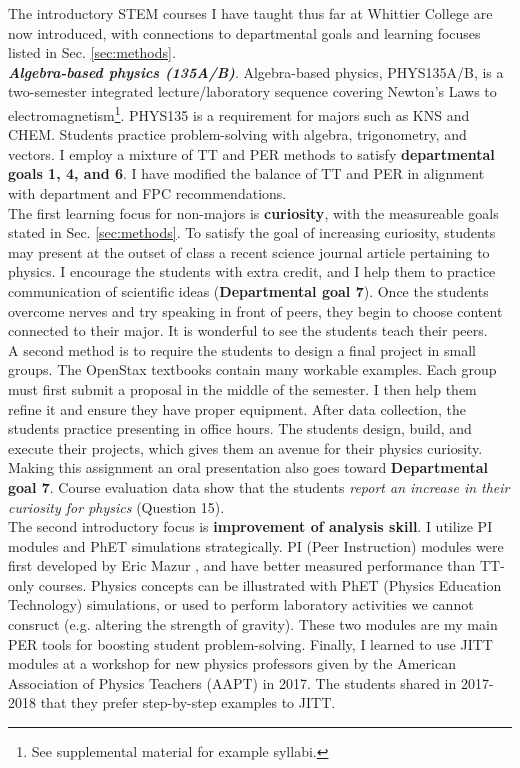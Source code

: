 \documentclass[../../../main.tex]{subfiles}
\begin{document}
The introductory STEM courses I have taught thus far at Whittier College are now introduced, with connections to departmental goals and learning focuses listed in Sec. \ref{sec:methods}.
\\
\vspace{0.25cm}
\textbf{\textit{Algebra-based physics (135A/B)}}. Algebra-based physics, PHYS135A/B, is a two-semester integrated lecture/laboratory sequence covering Newton's Laws to electromagnetism\footnote{See supplemental material for example syllabi.}.  PHYS135 is a requirement for majors such as KNS and CHEM.  Students practice problem-solving with algebra, trigonometry, and vectors.  I employ a mixture of TT and PER methods to satisfy \textbf{departmental goals 1, 4, and 6}.  I have modified the balance of TT and PER in alignment with department and FPC recommendations.
\\
\vspace{0.25cm}
The first learning focus for non-majors is \textbf{curiosity}, with the measureable goals stated in Sec. \ref{sec:methods}.  To satisfy the goal of increasing curiosity, students may present at the outset of class a recent science journal article pertaining to physics.  I encourage the students with extra credit, and I help them to practice communication of scientific ideas (\textbf{Departmental goal 7}).  Once the students overcome nerves and try speaking in front of peers, they begin to choose content connected to their major.  It is wonderful to see the students teach their peers.
\\
\vspace{0.25cm}
A second method is to require the students to design a final project in small groups.  The OpenStax textbooks contain many workable examples.  Each group must first submit a proposal in the middle of the semester.  I then help them refine it and ensure they have proper equipment.  After data collection, the students practice presenting in office hours.  The students design, build, and execute their projects, which gives them an avenue for their physics curiosity.  Making this assignment an oral presentation also goes toward \textbf{Departmental goal 7}.  Course evaluation data show that the students \textit{report an increase in their curiosity for physics} (Question 15).
\\
\vspace{0.25cm}
The second introductory focus is \textbf{improvement of analysis skill}.  I utilize PI modules and PhET simulations strategically.  PI (Peer Instruction) modules were first developed by Eric Mazur \cite{mazur2013peer}, and have better measured performance than TT-only courses.  Physics concepts can be illustrated with PhET (Physics Education Technology) simulations, or used to perform laboratory activities we cannot consruct (e.g. altering the strength of gravity)\cite{phet}.  These two modules are my main PER tools for boosting student problem-solving.  Finally, I learned to use JITT modules \cite{jitt} at a workshop for new physics professors given by the American Association of Physics Teachers (AAPT) in 2017.  The students shared in 2017-2018 that they prefer step-by-step examples to JITT.
\end{document}
